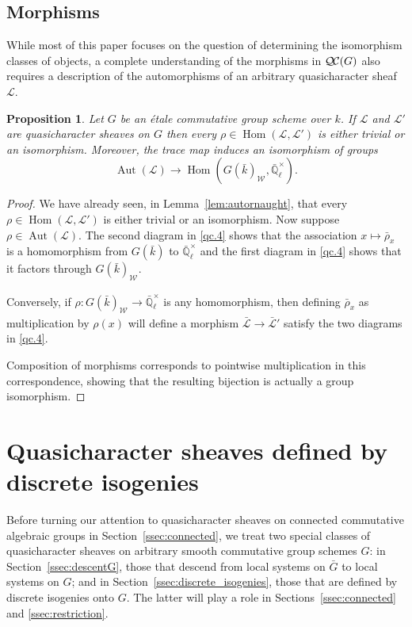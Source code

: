 \documentclass[CM,Submssn,SecEq]{degruyter-crelle} %
\theoremstyle{plain}
\newtheorem{proposition}[theorem]{Proposition}
\theoremstyle{definition}
\theoremstyle{remark}
\newcommand{\EE}{\mathbb{\bar Q}_\ell}
\newcommand{\bFq}{\bar{k}}
\newcommand{\Fq}{k}
\newcommand{\EEx}{\EE^\times}
\newcommand{\Weil}[1]{\mathcal{W}_{#1}}
\DeclareMathOperator{\Aut}{Aut}
\DeclareMathOperator{\Hom}{Hom}
\newcommand{\qcs}[1]{{\mathcal{#1}}}
\newcommand{\gqcs}[1]{{\mathcal{\bar #1}}}
\newcommand{\QC}{{\mathcal{Q\hskip-0.8pt C}}}
\newcommand{\bG}{\bar{G}}
\newcommand{\brho}{{\bar\rho}}
\begin{document}
\subsection{Morphisms}\label{ssec:mor-etale}

While most of this paper focuses on the question of determining the isomorphism classes of objects, a complete understanding of the morphisms in $\QC(G)$ also requires a description of the automorphisms of an arbitrary quasicharacter sheaf $\qcs{L}$.

\begin{proposition}\label{prop:autornaught_etale}
Let $G$ be an \'etale commutative group scheme over $\Fq$.
If $\qcs{L}$ and $\qcs{L}'$ are quasicharacter sheaves on $G$ then
every $\rho\in \Hom(\qcs{L},\qcs{L}')$ is either trivial or an isomorphism. Moreover, the trace map induces an isomorphism of groups
\[
\Aut(\qcs{L}) \to \Hom(G(\bFq)_{\Weil{}}, \EEx).
\]
\end{proposition}

\begin{proof}
We have already seen, in Lemma~\ref{lem:autornaught}, that every $\rho\in \Hom(\qcs{L},\qcs{L}')$ is either trivial or an isomorphism.
Now suppose $\rho \in \Aut(\qcs{L})$.
The second diagram in \ref{qc.4} shows that the association $x \mapsto \brho_x$ is a homomorphism from $G(\bFq)$ to $\EEx$ and the first diagram in \ref{qc.4} shows that it factors through $G(\bFq)_{\Weil{}}$.  

Conversely, if $\rho : G(\bFq)_{\Weil{}} \to \EEx$ is any homomorphism, then defining $\brho_x$ as multiplication by $\rho(x)$ will define a morphism $\gqcs{L} \to \gqcs{L}'$ satisfy the two diagrams in \ref{qc.4}.  

Composition of morphisms corresponds to pointwise multiplication in this correspondence, showing that the resulting bijection is actually a group isomorphism.
\end{proof}


\section{Quasicharacter sheaves defined by discrete isogenies} \label{sec:disc-isog}

Before turning our attention to quasicharacter sheaves on connected commutative algebraic groups in Section~\ref{ssec:connected}, we treat two special classes of quasicharacter sheaves on arbitrary smooth commutative group schemes $G$:  in Section~\ref{ssec:descentG}, those that descend from local systems on $\bG$ to local systems on $G$; and in Section~\ref{ssec:discrete_isogenies}, those that are defined by discrete isogenies onto $G$. The latter will play a role in Sections~\ref{ssec:connected} and \ref{ssec:restriction}.
\end{document}
